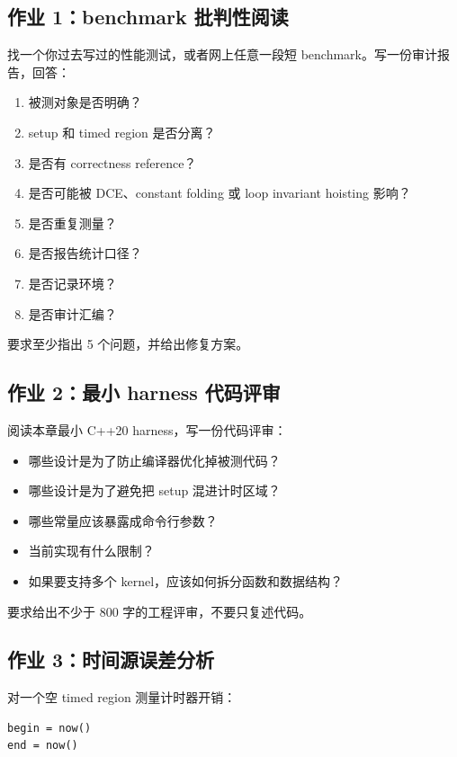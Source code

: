 \begin{exercisebox}
\subsection*{作业 1：benchmark 批判性阅读}

找一个你过去写过的性能测试，或者网上任意一段短 benchmark。写一份审计报告，回答：

\begin{enumerate}
  \item 被测对象是否明确？
  \item setup 和 timed region 是否分离？
  \item 是否有 correctness reference？
  \item 是否可能被 DCE、constant folding 或 loop invariant hoisting 影响？
  \item 是否重复测量？
  \item 是否报告统计口径？
  \item 是否记录环境？
  \item 是否审计汇编？
\end{enumerate}

要求至少指出 5 个问题，并给出修复方案。

\subsection*{作业 2：最小 harness 代码评审}

阅读本章最小 C++20 harness，写一份代码评审：

\begin{itemize}
  \item 哪些设计是为了防止编译器优化掉被测代码？
  \item 哪些设计是为了避免把 setup 混进计时区域？
  \item 哪些常量应该暴露成命令行参数？
  \item {} 当前实现有什么限制？
  \item 如果要支持多个 kernel，应该如何拆分函数和数据结构？
\end{itemize}

要求给出不少于 800 字的工程评审，不要只复述代码。

\subsection*{作业 3：时间源误差分析}

对一个空 timed region 测量计时器开销：

\begin{lstlisting}
begin = now()
end = now()
\end{lstlisting}


\end{exercisebox}
